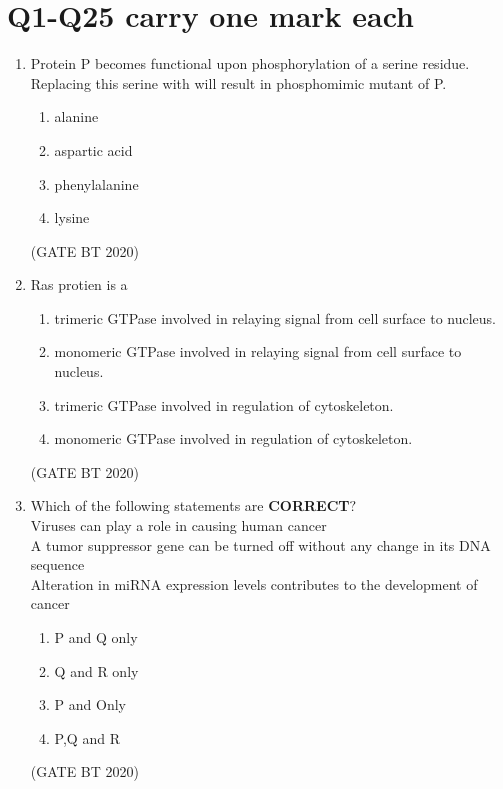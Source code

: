\documentclass[journal,12pt,onecolumn]{IEEEtran}
\theoremstyle{remark}
\begin{document}
\section{Q1-Q25 carry one mark each}
\begin{enumerate}[label=Q\arabic*:]
\item Protein P becomes functional upon phosphorylation of a serine residue. Replacing this serine with   will result in phosphomimic mutant of P.
\begin{multicols}{4}
\begin{enumerate}
\item\;alanine
\item\;aspartic acid
\item\;phenylalanine
\item\;lysine
\end{enumerate}
\end{multicols} \hfill(GATE BT 2020)

\item Ras protien is a
\begin{multicols}{2}
\begin{enumerate}
\item\;trimeric GTPase involved in relaying signal from cell surface to nucleus.
\item\;monomeric GTPase involved in relaying signal from cell surface to nucleus.
\item\;trimeric GTPase involved in regulation of cytoskeleton.
\item\;monomeric GTPase involved in regulation of cytoskeleton. 
\end{enumerate}
\end{multicols}
\hfill(GATE BT 2020)

\item Which of the following statements are \textbf{CORRECT}$?$\\
Viruses can play a role in causing human cancer\\
A tumor suppressor gene can be turned off without any change in its DNA sequence\\
 Alteration in miRNA expression levels contributes to the development of cancer
\begin{multicols}{2}
\begin{enumerate}

\item\;P and Q only
\item\;Q and R only
\item\;P and Only
\item\;P,Q and R
\end{enumerate}
\end{multicols}
\hfill(GATE BT 2020)


\end{enumerate}
\end{document}
